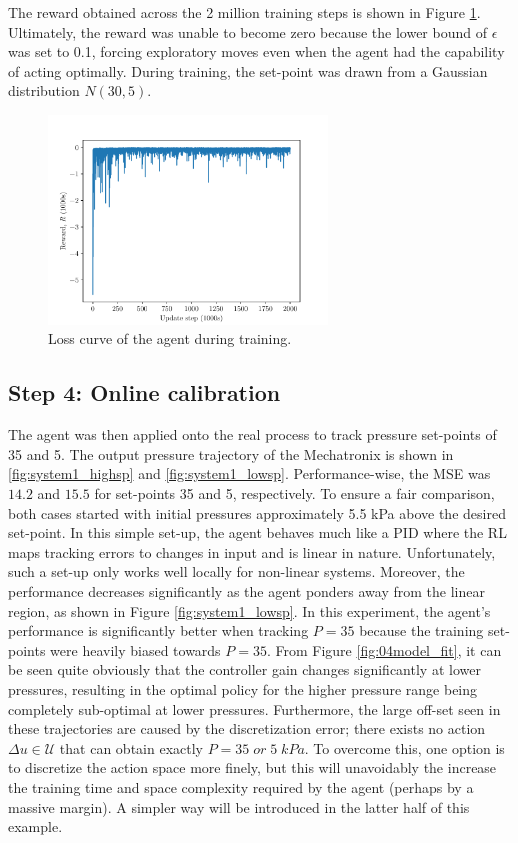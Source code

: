The reward obtained across the 2 million training steps is shown in Figure \ref{fig:loss_curve}. Ultimately, the reward was unable to become zero because the lower bound of $\epsilon$ was set to 0.1, forcing exploratory moves even when the agent had the capability of acting optimally. During training, the set-point was drawn from a Gaussian distribution $N(30, 5)$. 
\begin{figure}[H]
    \centering
    \includegraphics[width=0.66\textwidth]{images/ch4/loss_curve.pdf}
    \caption{Loss curve of the agent during training.}
    \label{fig:loss_curve}
\end{figure}

\subsection{Step 4: Online calibration}

The agent was then applied onto the real process to track pressure set-points of 35 and 5.  The output pressure trajectory of the Mechatronix is shown in \ref{fig:system1_highsp} and \ref{fig:system1_lowsp}. Performance-wise, the MSE was $14.2$ and $15.5$ for set-points 35 and 5, respectively. To ensure a fair comparison, both cases started with initial pressures approximately 5.5 kPa above the desired set-point. In this simple set-up, the agent behaves much like a PID where the RL maps tracking errors to changes in input and is linear in nature. Unfortunately, such a set-up only works well locally for non-linear systems. Moreover, the performance decreases significantly as the agent ponders away from the linear region, as shown in Figure \ref{fig:system1_lowsp}. In this experiment, the agent's performance is significantly better when tracking $P=35$ because the training set-points were heavily biased towards $P=35$.  From Figure \ref{fig:04model_fit}, it can be seen quite obviously that the controller gain changes significantly at lower pressures, resulting in the optimal policy for the higher pressure range being completely sub-optimal at lower pressures. Furthermore, the large off-set seen in these trajectories are caused by the discretization error; there exists no action $\Delta u \in \mathcal{U}$ that can obtain exactly $P = 35 \; or \; 5 \; kPa$. To overcome this, one option is to discretize the action space more finely, but this will unavoidably the increase the training time and space complexity required by the agent (perhaps by a massive margin).  A simpler way will be introduced in the latter half of this example.

